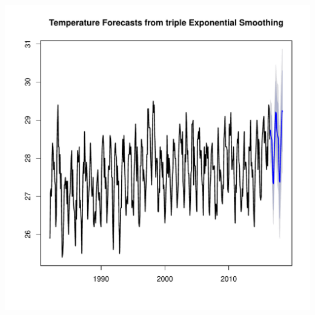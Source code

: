 \documentclass[10pt]{article}\usepackage[]{graphicx}\usepackage[]{color}
\makeatletter
\def\maxwidth{ %
  \ifdim\Gin@nat@width>\linewidth
    \linewidth
  \else
    \Gin@nat@width
  \fi
}
\newenvironment{kframe}{%
 \def\at@end@of@kframe{}%
 \ifinner\ifhmode%
  \def\at@end@of@kframe{\end{minipage}}%
  \begin{minipage}{\columnwidth}%
 \fi\fi%
 \def\FrameCommand##1{\hskip\@totalleftmargin \hskip-\fboxsep
 \colorbox{shadecolor}{##1}\hskip-\fboxsep
     \hskip-\linewidth \hskip-\@totalleftmargin \hskip\columnwidth}%
 \MakeFramed {\advance\hsize-\width
   \@totalleftmargin\z@ \linewidth\hsize
   \@setminipage}}%
 {\par\unskip\endMakeFramed%
 \at@end@of@kframe}
\newenvironment{knitrout}{}{} %
\makeatother
\begin{document}
\begin{knitrout}
\begin{kframe}
\end{kframe}
\includegraphics[width=\maxwidth]{figure/unnamed-chunk-29-1} 

\end{knitrout}
\end{document}
